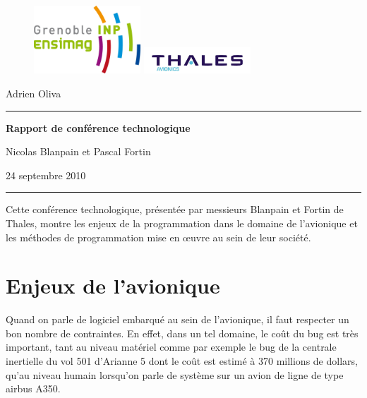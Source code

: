 \documentclass[a4paper,10pt]{article}
\begin{document}
\begin{figure}
	\centering
	\includegraphics[width=40mm]{img/ensimag.png}
	\includegraphics[width=40mm]{img/thales_avionics.png}
\end{figure}

Adrien Oliva

\rule{5cm}{1pt}

\vspace{1cm}

\begin{center}
\Large
\textbf{Rapport de conférence technologique}
\normalsize
\end{center}

\begin{flushright}
Nicolas Blanpain et Pascal Fortin

24 septembre 2010
\end{flushright}

\vspace{10mm}

\rule{15cm}{0.5pt}

\vspace{2cm}

Cette conférence technologique, présentée par messieurs Blanpain et Fortin
de Thales, montre les enjeux de la programmation dans le domaine de 
l'avionique et les méthodes de programmation mise en \oe{}uvre au sein de 
leur société.

\section{Enjeux de l'avionique}

Quand on parle de logiciel embarqué au sein de l'avionique, il faut 
respecter un bon nombre de contraintes. En effet, dans un tel domaine, le
coût du bug est très important, tant au niveau matériel comme par exemple
le bug de la centrale inertielle du vol 501 d'Arianne 5 dont le coût est
estimé à 370 millions de dollars, qu'au niveau humain lorsqu'on parle de
système sur un avion de ligne de type airbus A350.
\end{document}
